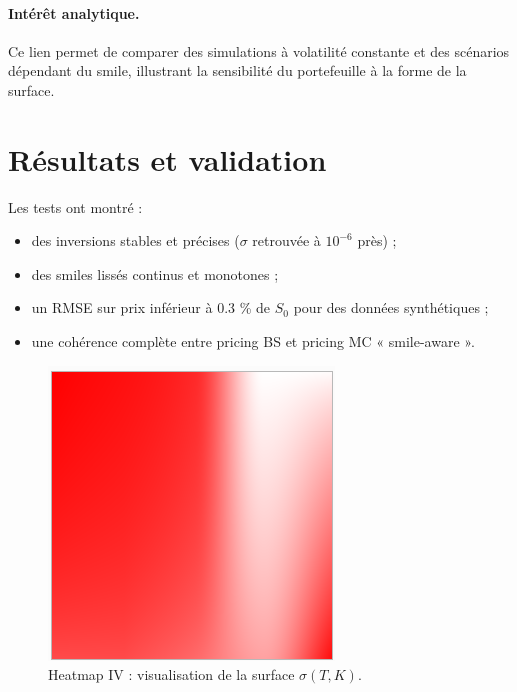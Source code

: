 \documentclass[11pt,a4paper]{article}
\begin{document}
\paragraph{Intérêt analytique.}
Ce lien permet de comparer des simulations à volatilité constante et des scénarios dépendant du smile, illustrant la sensibilité du portefeuille à la forme de la surface.

\section{Résultats et validation \label{sec:results}}
Les tests ont montré :
\begin{itemize}
  \item des inversions stables et précises ($\sigma$ retrouvée à $10^{-6}$ près) ;
  \item des smiles lissés continus et monotones ;
  \item un RMSE sur prix inférieur à 0.3 \% de $S_0$ pour des données synthétiques ;
  \item une cohérence complète entre pricing BS et pricing MC « smile-aware ».
\end{itemize}

\begin{figure}[h!]
  \centering
  \includegraphics[width=0.9\linewidth]{img/heatmap_seule.png}
  \caption{Heatmap IV : visualisation de la surface $\sigma(T,K)$.}
\end{figure}
\end{document}
